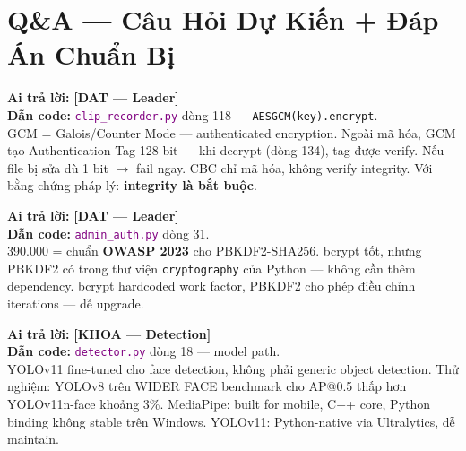 \documentclass[12pt, a4paper]{article}
\newcommand{\dat}{\textcolor{BrickRed}{\textbf{[DAT --- Leader]}}}
\newcommand{\khoa}{\textcolor{OliveGreen}{\textbf{[KHOA --- Detection]}}}
\newcommand{\fpath}[1]{\texttt{\textcolor{purple}{#1}}}
\begin{document}
\newpage

\section{Q\&A --- Câu Hỏi Dự Kiến + Đáp Án Chuẩn Bị}

\begin{tcolorbox}[colback=gray!5, colframe=BrickRed,
  title={\textbf{Q1: Tại sao AES-GCM không phải AES-CBC?}}, breakable]
\textbf{Ai trả lời:} \dat\\
\textbf{Dẫn code:} \fpath{clip\_recorder.py} dòng 118 --- \texttt{AESGCM(key).encrypt}.\\
GCM = Galois/Counter Mode --- authenticated encryption.
Ngoài mã hóa, GCM tạo Authentication Tag 128-bit ---
khi decrypt (dòng 134), tag được verify. Nếu file bị sửa dù 1 bit $\to$ fail ngay.
CBC chỉ mã hóa, không verify integrity.
Với bằng chứng pháp lý: \textbf{integrity là bắt buộc}.
\end{tcolorbox}

\begin{tcolorbox}[colback=gray!5, colframe=BrickRed,
  title={\textbf{Q2: Con số 390.000 lấy ở đâu? Tại sao không dùng bcrypt?}}, breakable]
\textbf{Ai trả lời:} \dat\\
\textbf{Dẫn code:} \fpath{admin\_auth.py} dòng 31.\\
390.000 = chuẩn \textbf{OWASP 2023} cho PBKDF2-SHA256.
bcrypt tốt, nhưng PBKDF2 có trong thư viện \texttt{cryptography} của Python --- không cần thêm dependency.
bcrypt hardcoded work factor, PBKDF2 cho phép điều chỉnh iterations --- dễ upgrade.
\end{tcolorbox}

\begin{tcolorbox}[colback=gray!5, colframe=OliveGreen,
  title={\textbf{Q3: YOLOv11 khác YOLOv8 thế nào? Sao không dùng MediaPipe?}}, breakable]
\textbf{Ai trả lời:} \khoa\\
\textbf{Dẫn code:} \fpath{detector.py} dòng 18 --- model path.\\
YOLOv11 fine-tuned cho face detection, không phải generic object detection.
Thử nghiệm: YOLOv8 trên WIDER FACE benchmark cho AP@0.5 thấp hơn YOLOv11n-face khoảng 3\%.
MediaPipe: built for mobile, C++ core, Python binding không stable trên Windows.
YOLOv11: Python-native via Ultralytics, dễ maintain.
\end{tcolorbox}
\end{document}
